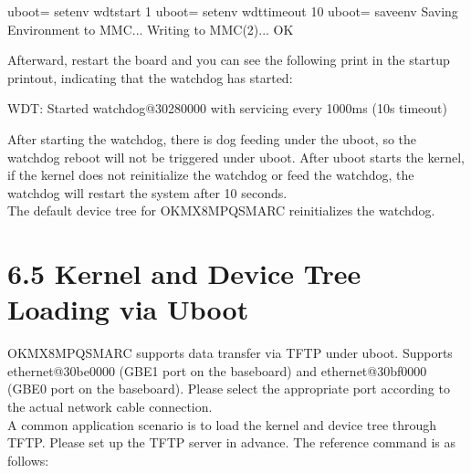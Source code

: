 \documentclass[letterpaper,10pt,openany,english]{sphinxmanual}
\begin{document}
\begin{sphinxVerbatim}[commandchars=\\\{\}]
u\PYGZhy{}boot=\PYGZgt{} setenv wdt\PYGZus{}start 1
u\PYGZhy{}boot=\PYGZgt{} setenv wdt\PYGZus{}timeout 10
u\PYGZhy{}boot=\PYGZgt{} saveenv
Saving Environment to MMC... Writing to MMC(2)... OK
\end{sphinxVerbatim}

\sphinxAtStartPar
Afterward, restart the board and you can see the following print in the startup printout, indicating that the watchdog has started:

\begin{sphinxVerbatim}[commandchars=\\\{\}]
WDT:   Started watchdog@30280000 with servicing every 1000ms (10s timeout)
\end{sphinxVerbatim}

\sphinxAtStartPar
After starting the watchdog, there is dog feeding under the uboot, so the watchdog reboot will not be triggered under uboot. After uboot starts the kernel, if the kernel does not reinitialize the watchdog or feed the watchdog, the watchdog will restart the system after 10 seconds.\\
The default device tree for OK\sphinxhyphen{}MX8MPQ\sphinxhyphen{}SMARC reinitializes the watchdog.


\section{6.5 Kernel and Device Tree Loading via Uboot}
\label{\detokenize{linux-manual:kernel-and-device-tree-loading-via-uboot}}
\sphinxAtStartPar
OK\sphinxhyphen{}MX8MPQ\sphinxhyphen{}SMARC supports data transfer via TFTP under uboot. Supports ethernet@30be0000 (GBE1 port on the baseboard) and ethernet@30bf0000 (GBE0 port on the baseboard). Please select the appropriate port according to the actual network cable connection.\\
A common application scenario is to load the kernel and device tree through TFTP. Please set up the TFTP server in advance. The reference command is as follows:
\end{document}
